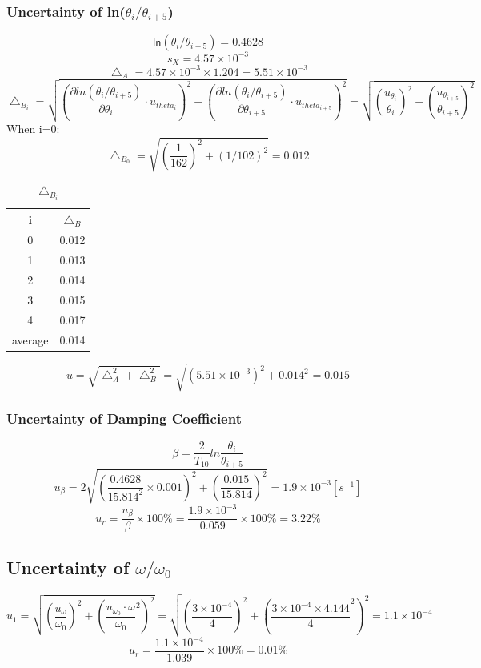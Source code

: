 \documentclass[12pt]{article}
\begin{document}
\subsubsection{Uncertainty of ln($\theta_i/\theta_{i+5}$)}
$$\textsf{ln}(\theta_i/\theta_{i+5})=0.4628$$
$$s_X=4.57\times10^{-3}$$
$$\bigtriangleup_A=4.57\times10^{-3}\times1.204=5.51\times10^{-3}$$
$$\bigtriangleup_{B_i}=\sqrt{(\frac{\partial{ln(\theta_i/\theta_{i+5})}}{\partial{\theta_i}}\cdot u_{theta_i})^2+(\frac{\partial{ln(\theta_i/\theta_{i+5})}}{\partial{\theta_{i+5}}}\cdot u_{theta_{i+5}})^2}=\sqrt{(\frac{u_{\theta_i}}{\theta_i})^2+(\frac{u_{\theta_{i+5}}}{\theta_{i+5}})^2}$$
When i=0:
$$\bigtriangleup_{B_0}=\sqrt{(\frac{1}{162})^2+(1/102)^2}=0.012$$
\begin{table}[H]
\centering
\begin{tabular}{|c|c|}
\hline
i  &$\bigtriangleup_B$  \\ \hline
0  &0.012  \\ \hline
1  &0.013  \\ \hline
2  &0.014  \\ \hline
3  &0.015  \\ \hline
4  &0.017  \\ \hline
average &0.014\\ \hline
\end{tabular}
\caption{$\bigtriangleup_{B_i}$}
\end{table}
$$u=\sqrt{\bigtriangleup_A^2+\bigtriangleup_B^2}=\sqrt{(5.51\times10^{-3})^2+0.014^2}=0.015$$
\subsubsection{Uncertainty of Damping Coefficient}
$$\beta=\frac{2}{T_{10}}ln\frac{\theta_i}{\theta_{i+5}}$$
$$u_{\beta}=2\sqrt{(\frac{0.4628}{15.814^2}\times0.001)^2+(\frac{0.015}{15.814})^2}=1.9\times10^{-3}[s^{-1}]$$
$$u_r=\frac{u_{\beta}}{\beta}\times100\%=\frac{1.9\times10^{-3}}{0.059}\times100\%=3.22\%$$
\subsection{Uncertainty of $\omega/\omega_0$}
$$u_1=\sqrt{(\frac{u_{\omega}}{\omega_0})^2+(\frac{u_{\omega_0}\cdot\omega}{\omega_0}^2)^2}=\sqrt{(\frac{3\times10^{-4}}{4})^2+(\frac{3\times10^{-4}\times4.144}{4}^2)^2}=1.1\times10^{-4}$$
$$u_r=\frac{1.1\times10^{-4}}{1.039}\times100\%=0.01\%$$
\end{document}
